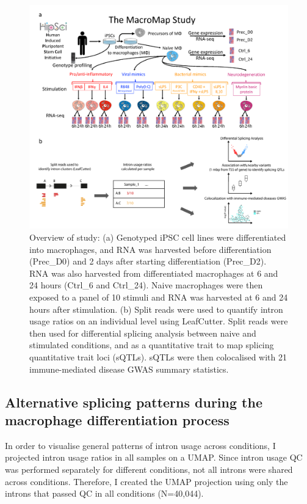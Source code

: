 \begin{figure}[H]
  \centering
  \includegraphics[width=\textwidth]{study_desc}
  \caption[MacroMap study overview]{Overview of study: (a) Genotyped iPSC cell lines were differentiated into macrophages, and RNA was harvested before differentiation (Prec\_D0) and 2 days after starting differentiation (Prec\_D2). RNA was also harvested from differentiated macrophages at 6 and 24 hours (Ctrl\_6 and Ctrl\_24). Naive macrophages were then exposed to a panel of 10 stimuli and RNA was harvested at 6 and 24 hours after stimulation. (b) Split reads were used to quantify intron usage ratios on an individual level using LeafCutter. Split reads were then used for differential splicing analysis between naive and stimulated conditions, and as a quantitative trait to map splicing quantitative trait loci (sQTLs). sQTLs were then colocalised with 21 immune-mediated disease GWAS summary statistics.}
  \label{fig:study_desc}   
\end{figure}


\subsection{Alternative splicing patterns during the macrophage differentiation process}
In order to visualise general patterns of intron usage across conditions, I projected intron usage ratios in all samples on a UMAP. Since intron usage QC was performed separately for different conditions, not all introns were shared across conditions. Therefore, I created the UMAP projection using only the introns that passed QC in all conditions (N=40,044).\\

